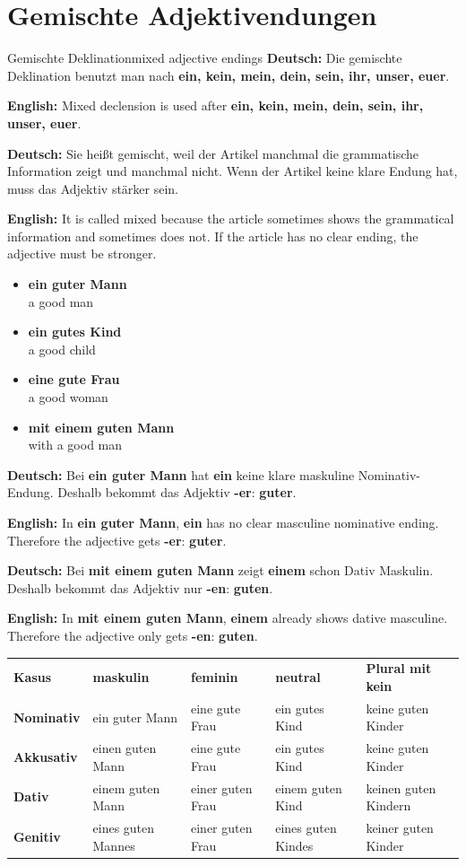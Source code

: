 \documentclass[a4paper,11pt]{article}
\newcommand{\GermanText}[1]{\textbf{Deutsch: }#1\par}
\newcommand{\EnglishText}[1]{{\small\color{SoftGray}\textbf{English: }#1\par}}
\newcommand{\ExampleItem}[2]{\item \textbf{#1}\\{\small\color{SoftGray}#2}}
\begin{document}
\section{Gemischte Adjektivendungen}

\begin{grammarentry}{Gemischte Deklination}{mixed adjective endings}
\GermanText{Die gemischte Deklination benutzt man nach \textbf{ein, kein, mein, dein, sein, ihr, unser, euer}.}
\EnglishText{Mixed declension is used after \textbf{ein, kein, mein, dein, sein, ihr, unser, euer}.}

\GermanText{Sie heißt gemischt, weil der Artikel manchmal die grammatische Information zeigt und manchmal nicht. Wenn der Artikel keine klare Endung hat, muss das Adjektiv stärker sein.}
\EnglishText{It is called mixed because the article sometimes shows the grammatical information and sometimes does not. If the article has no clear ending, the adjective must be stronger.}

\begin{exbox}
\begin{itemize}
    \ExampleItem{ein guter Mann}{a good man}
    \ExampleItem{ein gutes Kind}{a good child}
    \ExampleItem{eine gute Frau}{a good woman}
    \ExampleItem{mit einem guten Mann}{with a good man}
\end{itemize}
\end{exbox}

\GermanText{Bei \textbf{ein guter Mann} hat \textbf{ein} keine klare maskuline Nominativ-Endung. Deshalb bekommt das Adjektiv \textbf{-er}: \textbf{guter}.}
\EnglishText{In \textbf{ein guter Mann}, \textbf{ein} has no clear masculine nominative ending. Therefore the adjective gets \textbf{-er}: \textbf{guter}.}

\GermanText{Bei \textbf{mit einem guten Mann} zeigt \textbf{einem} schon Dativ Maskulin. Deshalb bekommt das Adjektiv nur \textbf{-en}: \textbf{guten}.}
\EnglishText{In \textbf{mit einem guten Mann}, \textbf{einem} already shows dative masculine. Therefore the adjective only gets \textbf{-en}: \textbf{guten}.}
\end{grammarentry}

\begin{center}
\begin{tabular}{>{\bfseries}p{2.5cm}p{3cm}p{3cm}p{3cm}p{3cm}}
\rowcolor{HeaderBlueDark}
\color{white}\textbf{Kasus} & \color{white}\textbf{maskulin} & \color{white}\textbf{feminin} & \color{white}\textbf{neutral} & \color{white}\textbf{Plural mit kein} \\
Nominativ & ein guter Mann & eine gute Frau & ein gutes Kind & keine guten Kinder \\
Akkusativ & einen guten Mann & eine gute Frau & ein gutes Kind & keine guten Kinder \\
Dativ & einem guten Mann & einer guten Frau & einem guten Kind & keinen guten Kindern \\
Genitiv & eines guten Mannes & einer guten Frau & eines guten Kindes & keiner guten Kinder \\
\end{tabular}
\end{center}
\end{document}
